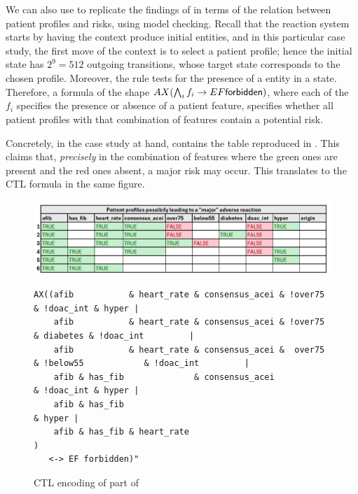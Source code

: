 \medskip\noindent We can also use \GROOVE to replicate the findings of  \cite[Fig.\ 6]{DBLP:conf/cmsb/BowlesBBFGM24} in terms of the relation between patient profiles and risks, using model checking. Recall that the reaction system starts by having the context produce initial entities, and in this particular case study, the first move of the context is to select a patient profile; hence the initial state has $2^9=512$ outgoing transitions, whose target state corresponds to the chosen profile. Moreover, the rule \forbidden tests for the presence of a \Forbidden entity in a state. Therefore, a formula of the shape
$AX(\bigwedge_i f_i \rightarrow EF {\text{\sffamily forbidden}})$, where each of the $f_i$ specifies the presence or absence of a patient feature, specifies whether all patient profiles with that combination of features contain a potential risk.

Concretely, in the case study at hand, \cite[Fig.~6]{DBLP:conf/cmsb/BowlesBBFGM24} contains the table reproduced in . This claims that, \emph{precisely} in the combination of features where the green ones are present and the red ones absent, a major risk may occur. This translates to the CTL formula in the same figure.

\begin{figure}
\centering
\includegraphics[scale=.4]{./figs/table-from-cmsb2024}\begin{lstlisting}[basicstyle=\ttfamily\small,xleftmargin=0cm]
AX((afib           & heart_rate & consensus_acei & !over75                       & !doac_int & hyper |
    afib           & heart_rate & consensus_acei & !over75            & diabetes & !doac_int         |
    afib           & heart_rate & consensus_acei &  over75 & !below55            & !doac_int         |
    afib & has_fib              & consensus_acei                                 & !doac_int & hyper |
    afib & has_fib                                                                           & hyper |
    afib & has_fib & heart_rate                                                                      )
   <-> EF forbidden)"
\end{lstlisting}
\caption{CTL encoding of part of \cite[Fig.~6]{DBLP:conf/cmsb/BowlesBBFGM24}}
\label{fig:table-from-cmsb2024}
\end{figure}

